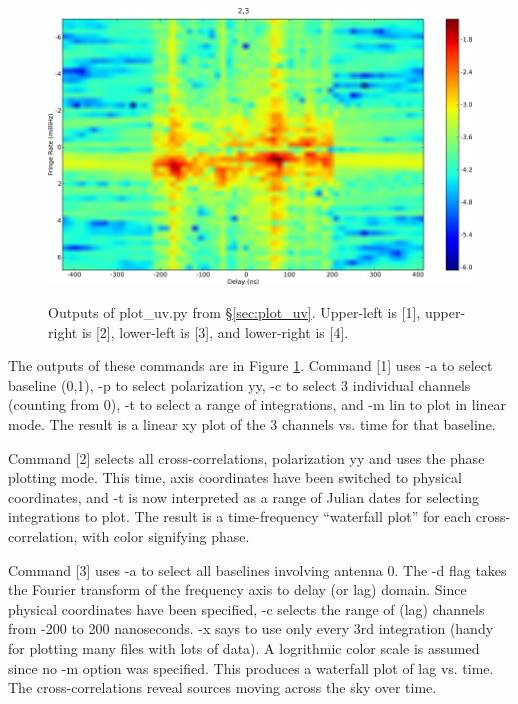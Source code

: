 \begin{figure}
\begin{center}
\includegraphics[scale=.23]{plot_uv4.jpg}\\
\caption{Outputs of plot\_uv.py from \S\ref{sec:plot_uv}. Upper-left is [1],
upper-right is [2], lower-left is [3], and lower-right is [4].}
\label{fig:plot_uv}
\end{center}
\end{figure}

The outputs of these commands are in Figure \ref{fig:plot_uv}.  Command [1]
uses -a to select baseline (0,1), -p to select polarization yy, -c to
select 3 individual channels (counting from 0), -t to select a range of
integrations, and -m lin to plot in linear mode.  The result
is a linear xy plot of the 3 channels vs. time for that baseline.

Command [2] selects all cross-correlations, polarization yy and uses
the phase plotting mode.  This time, axis coordinates have been switched
to physical coordinates, and -t is now interpreted as a range of Julian dates
for selecting integrations to plot.  The result is a time-frequency 
``waterfall plot'' for each cross-correlation, with color signifying phase.

Command [3] uses -a to select all baselines involving antenna 0.  The
-d flag takes the Fourier transform of the frequency axis to delay (or lag)
domain.  Since physical coordinates have been specified, -c selects the 
range of (lag) channels from -200 to 200 nanoseconds.  -x says to use
only every 3rd integration (handy for plotting many files with lots of data).
A logrithmic color scale is assumed since no -m option was specified. 
This produces a waterfall plot of lag vs. time.  The
cross-correlations reveal sources moving across the sky over time.

